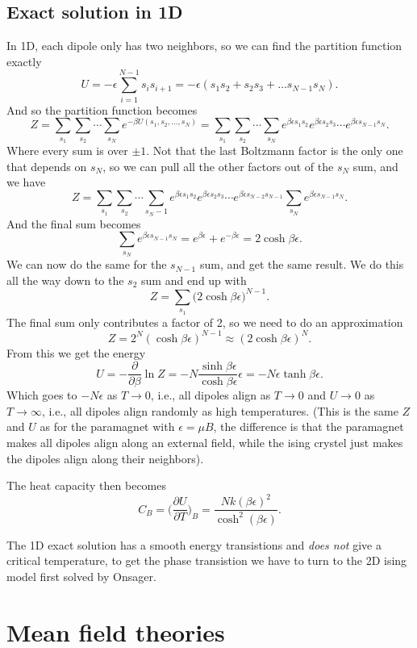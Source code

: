 \documentclass[a4paper, 11pt, notitlepage, english]{article}
\newcommand{\eps}{\epsilon}
\newcommand{\p}{\partial}
\begin{document}
\subsection*{Exact solution in 1D}
In 1D, each dipole only has two neighbors, so we can find the partition function exactly
$$U = -\eps \sum_{i=1}^{N-1} s_i s_{i+1} = -\eps(s_1s_2 + s_2s_3 + \ldots s_{N-1}s_N).$$
And so the partition function becomes
$$Z = \sum_{s_1}\sum_{s_2}\cdots\sum_{s_N}e^{-\beta U(s_1,s_2,\ldots,s_N)} =  \sum_{s_1}\sum_{s_2}\cdots\sum_{s_N} e^{\beta \eps s_1s_2}e^{\beta \eps s_2s_3}\cdots e^{\beta \eps s_{N-1}s_{N}}.$$
Where every sum is over $\pm 1$. Not that the last Boltzmann factor is the only one that depends on $s_N$, so we can pull all the other factors out of the $s_N$ sum, and we have
$$Z = \sum_{s_1}\sum_{s_2}\cdots\sum_{s_N-1} e^{\beta \eps s_1s_2}e^{\beta \eps s_2s_3}\cdots e^{\beta \eps s_{N-2}s_{N-1}} \sum_{s_N} e^{\beta \eps s_{N-1}s_{N}}.$$
And the final sum becomes
$$\sum_{s_N} e^{\beta \eps s_{N-1}s_{N}} = e^{\beta \eps} + e^{-\beta \eps} = 2\cosh\beta \eps.$$
We can now do the same for the $s_{N-1}$ sum, and get the same result. We do this all the way down to the $s_2$ sum and end up with
$$Z = \sum_{s_1} \big(2\cosh \beta \eps \big)^{N-1}.$$
The final sum only contributes a factor of 2, so we need to do an approximation
$$Z = 2^N (\cosh \beta \eps)^{N-1} \approx (2 \cosh \beta \eps)^N.$$
From this we get the energy
$$U = -\frac{\p}{\p \beta} \ln Z = -N \frac{\sinh \beta \eps}{\cosh \beta \eps} \eps = - N\eps \tanh \beta \eps.$$
Which goes to $-N\eps$ as $T\to 0$, i.e., all dipoles align as $T\to 0$ and $U \to 0$ as $T \to \infty$, i.e., all dipoles align randomly as high temperatures. (This is the same $Z$ and $U$ as for the paramagnet with $\eps = \mu B$, the difference is that the paramagnet makes all dipoles align along an external field, while the ising crystel just makes the dipoles align along their neighbors).

The heat capacity then becomes
$$C_B = \bigg(\frac{\p U}{\p T}\bigg)_B = \frac{Nk (\beta \eps)^2}{\cosh^2(\beta \eps)}.$$

The 1D exact solution has a smooth energy transistions and \emph{does not} give a critical temperature, to get the phase transistion we have to turn to the 2D ising model first solved by Onsager.

\section*{Mean field theories}
\end{document}
